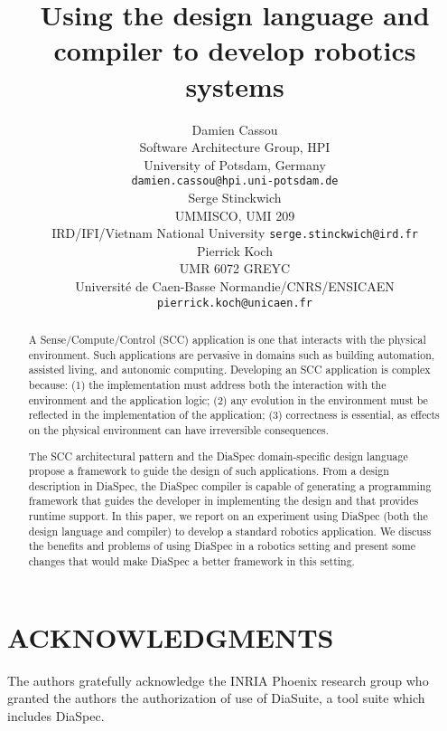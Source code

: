 \documentclass[letterpaper, 10 pt, conference]{ieeeconf}  %
\title{Using the \diaspec{} design language and compiler to develop
  robotics systems}
\author{%
  \parbox{2.4 in}{\centering Damien Cassou\\
    Software Architecture Group, HPI\\
    University of Potsdam, Germany\\%
    {\tt\small damien.cassou@hpi.uni-potsdam.de}}
  \hspace*{ 0.1 in}
  \parbox{2.35 in}{ \centering Serge Stinckwich\\
UMMISCO, UMI 209\\IRD/IFI/Vietnam National University
    {\tt\small serge.stinckwich@ird.fr}}
  \hspace*{ 0.1 in}
  \parbox{1.9 in}{ \centering Pierrick Koch\\
UMR 6072 GREYC\\Université de Caen-Basse Normandie/CNRS/ENSICAEN\\
    {\tt\small pierrick.koch@unicaen.fr}}
}
\newcommand{\diaspec}{Dia\-Spec\xspace}
\begin{document}
\maketitle
\thispagestyle{empty}
\pagestyle{empty}


\begin{abstract}

  A Sense/Compute/Control (SCC) application is one that interacts with
  the physical environment. Such applications are pervasive in domains
  such as building automation, assisted living, and autonomic
  computing. Developing an SCC application is complex because: (1) the
  implementation must address both the interaction with the
  environment and the application logic; (2) any evolution in the
  environment must be reflected in the implementation of the
  application; (3) correctness is essential, as effects on the
  physical environment can have irreversible consequences.

  The SCC architectural pattern and the \diaspec{} domain-specific
  design language propose a framework to guide the design of such
  applications. From a design description in \diaspec{}, the
  \diaspec{} compiler is capable of generating a programming framework
  that guides the developer in implementing the design and that
  provides runtime support. In this paper, we report on an experiment
  using \diaspec{} (both the design language and compiler) to develop
  a standard robotics application. We discuss the benefits and
  problems of using \diaspec{} in a robotics setting and present some
  changes that would make \diaspec{} a better framework in this
  setting.

\end{abstract}








\section{ACKNOWLEDGMENTS}

The authors gratefully acknowledge the INRIA Phoenix research group
who granted the authors the authorization of use of DiaSuite, a tool
suite which includes \diaspec{}.



\end{document}
